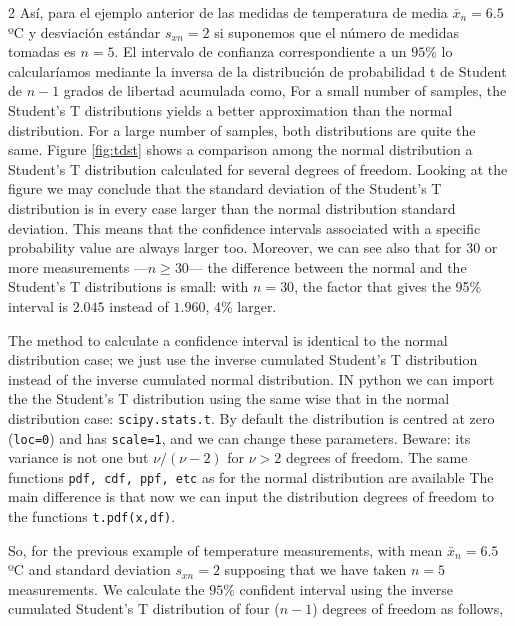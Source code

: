 \begin{paracol}{2}
Así, para el ejemplo anterior de las medidas de temperatura de media  $\bar{x}_n=6.5$ ºC y  desviación estándar $s_{xn}=2$  si suponemos que el número de medidas tomadas es $n=5$. El intervalo de confianza correspondiente a un $95\%$  lo calcularíamos mediante la inversa de la distribución de probabilidad t de Student de $n-1$ grados de libertad acumulada como,
\switchcolumn
For a small number of samples, the Student's T distributions yields a better approximation than the normal distribution. For a large number of samples, both distributions are quite the same. Figure \ref{fig:tdst} shows a comparison among the normal distribution a Student's T distribution calculated for several degrees of freedom. Looking at the figure we may conclude that the standard deviation of the Student's T distribution is in every case larger than the normal distribution standard deviation. This means that the confidence intervals associated with a specific probability value are always larger too. Moreover, we can see also that for 30 or more measurements ---$n\geqslant 30$--- the difference between the normal and the Student's T distributions is small: with $n=30$, the factor that gives the 95\% interval is $2.045$ instead of $1.960$, 4\% larger.

The method to calculate a confidence interval is identical to the normal distribution case; we just use the inverse cumulated Student's T distribution instead of the inverse cumulated normal distribution. IN python we can import the the Student's T distribution using the same wise that in the normal distribution case: \texttt{scipy.stats.t}. By default the distribution is centred at zero (\texttt{loc=0}) and has \texttt{scale=1}, and we can change these parameters. Beware: its variance is not one but $\nu/(\nu-2)$ for $\nu>2$ degrees of freedom. The same functions \texttt{pdf, cdf, ppf, etc} as for the normal distribution are available The main difference  is that now we can input the distribution degrees of freedom to the functions \texttt{t.pdf(x,df)}. 

So, for the previous example of temperature measurements, with mean $\bar{x}_n=6.5$ ºC and standard deviation $s_{xn}=2$ supposing that we have taken $n=5$ measurements. We calculate the $95\%$ confident interval using the inverse cumulated Student's T distribution of four ($n-1$) degrees of freedom as follows,
\end{paracol}

